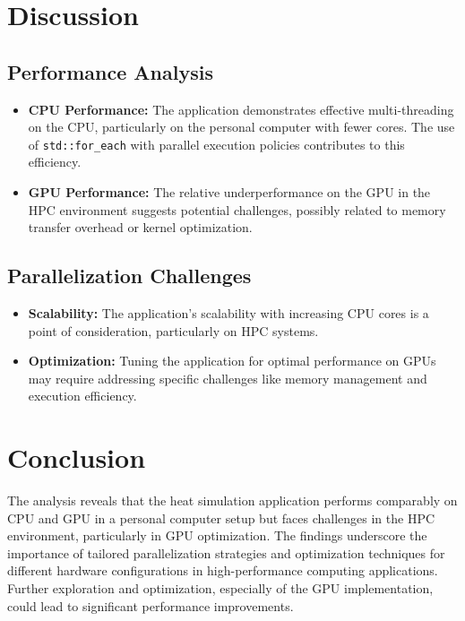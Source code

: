 \documentclass[11pt]{article}
\begin{document}
    \hypertarget{discussion}{%
    \section{Discussion}\label{discussion}}

    \hypertarget{performance-analysis}{%
    \subsection{Performance Analysis}\label{performance-analysis}}

    \begin{itemize}

    \item
      \textbf{CPU Performance:} The application demonstrates effective
      multi-threading on the CPU, particularly on the personal computer with
      fewer cores. The use of \texttt{std::for\_each} with parallel
      execution policies contributes to this efficiency.
    \item
      \textbf{GPU Performance:} The relative underperformance on the GPU in
      the HPC environment suggests potential challenges, possibly related to
      memory transfer overhead or kernel optimization.
    \end{itemize}

    \hypertarget{parallelization-challenges}{%
    \subsection{Parallelization
    Challenges}\label{parallelization-challenges}}

    \begin{itemize}

    \item
      \textbf{Scalability:} The application's scalability with increasing
      CPU cores is a point of consideration, particularly on HPC systems.
    \item
      \textbf{Optimization:} Tuning the application for optimal performance
      on GPUs may require addressing specific challenges like memory
      management and execution efficiency.
    \end{itemize}

    \hypertarget{conclusion}{%
    \section{Conclusion}\label{conclusion}}

    The analysis reveals that the heat simulation application performs
    comparably on CPU and GPU in a personal computer setup but faces
    challenges in the HPC environment, particularly in GPU optimization. The
    findings underscore the importance of tailored parallelization
    strategies and optimization techniques for different hardware
    configurations in high-performance computing applications. Further
    exploration and optimization, especially of the GPU implementation,
    could lead to significant performance improvements.

    
\end{document}
